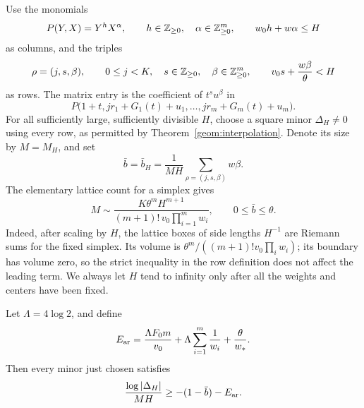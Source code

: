 Use the monomials
\[
 P(Y,X)=Y^hX^\alpha,
 \qquad h\in\mathbb Z_{\ge0},\quad \alpha\in\mathbb Z_{\ge0}^m,
 \qquad w_0h+w\alpha\le H
\]
as columns, and the triples
\[
 \rho=(j,s,\beta),\qquad
 0\le j<K,\quad s\in\mathbb Z_{\ge0},\quad\beta\in\mathbb Z_{\ge0}^m,
 \qquad v_0s+\frac{w\beta}{\theta}<H
\]
as rows.  The matrix entry is the coefficient of $t^su^\beta$ in
\begin{equation}
 P\bigl(1+t,jr_1+G_1(t)+u_1,\ldots,jr_m+G_m(t)+u_m\bigr).
 \label{det:matrix}
\end{equation}
For all sufficiently large, sufficiently divisible $H$, choose a square
minor $\Delta_H\ne0$ using every row, as permitted by
Theorem~\ref{geom:interpolation}.  Denote its size by $M=M_H$, and set
\begin{equation}
 \bar b=\bar b_H=\frac{1}{MH}\sum_{\rho=(j,s,\beta)}w\beta.
 \label{det:bbar}
\end{equation}
The elementary lattice count for a simplex gives
\begin{equation}
 M\sim
 \frac{K\theta^mH^{m+1}}{(m+1)!\,v_0\prod_{i=1}^m w_i},
 \qquad 0\le\bar b\le\theta.
 \label{det:row-count}
\end{equation}
Indeed, after scaling by $H$, the lattice boxes of side lengths $H^{-1}$
are Riemann sums for the fixed simplex.  Its volume is
$\theta^m/((m+1)!v_0\prod_iw_i)$; its boundary has volume zero, so the
strict inequality in the row definition does not affect the leading
term.  We always let $H$ tend to infinity only after all the weights and
centers have been fixed.

\begin{lemma}\label{det:arithmetic}
Let $\Lambda=4\log2$, and define
\begin{equation}
 E_{\rm ar}
 =\frac{\Lambda F_0m}{v_0}
  +\Lambda\sum_{i=1}^m\frac1{w_i}+\frac{\theta}{w_*}.
 \label{det:arith-error}
\end{equation}
Then every minor just chosen satisfies
\begin{equation}
 \frac{\log|\Delta_H|}{MH}
 \ge -(1-\bar b)-E_{\rm ar}.
 \label{det:lower}
\end{equation}
\end{lemma}

